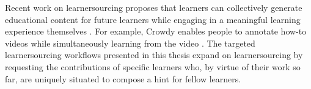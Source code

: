 Recent work on learnersourcing proposes that learners can collectively generate educational content for future learners while engaging in a meaningful learning experience themselves \cite{kim2013learnersourcing,weir2015,mitros2015}. For example, Crowdy enables people to annotate how-to videos while simultaneously learning from the video \cite{weir2015}. The targeted learnersourcing workflows presented in this thesis expand on learnersourcing by requesting the contributions of specific learners who, by virtue of their work so far, are uniquely situated to compose a hint for fellow learners. %




\begin{comment}
\section{Augmented Intelligence}
     "The power of the unaided mind is highly overrated… The real powers come from devising external aids that enhance cognitive abilities. " —Donald Norman 
     http://www.dougengelbart.org/pubs/augment-3906.html
\end{comment}